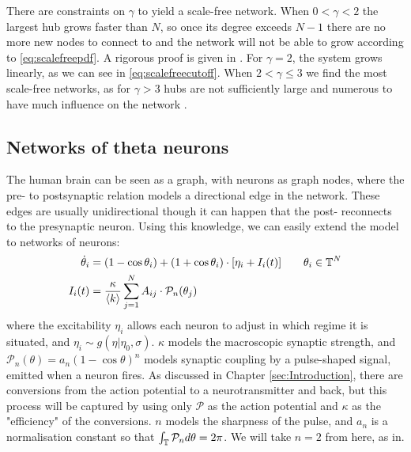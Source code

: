 There are constraints on $\gamma$ to yield a scale-free network. When $0 < \gamma < 2$ the largest hub grows faster than $N$, so once its degree exceeds $N-1$ there are no more new nodes to connect to and the network will not be able to grow according to \eqref{eq:scalefreepdf}. A rigorous proof is given in \cite{Bassler2011}. For $\gamma = 2$, the system grows linearly, as we can see in \eqref{eq:scalefreecutoff}. When $2 < \gamma \leq 3$ we find the most scale-free networks, as for $\gamma > 3$ hubs are not sufficiently large and numerous to have much influence on the network
\cite{BarabasiNetworkBook2016}.

\subsection{Networks of theta neurons}
The human brain can be seen as a graph, with neurons as graph nodes, where the pre- to postsynaptic relation models a directional edge in the network. These edges are usually unidirectional though it can happen that the post- reconnects to the presynaptic neuron. Using this knowledge, we can easily extend the model to networks of neurons:
\begin{align}
\dot{\theta}_{i} &=\left(1-\cos \theta_{i}\right)+\left(1+\cos \theta_{i}\right) \cdot \left[\eta_{i} + I_{i}(t)\right] \qquad \theta_i \in \T^N  \label{eq:thetaneuronnetwork} \\
I_{i}(t) &=\frac{\kappa}{\kmean} \sum_{j=1}^{N} A_{i j} \cdot \mathcal{P}_{n}(\theta_{j}) \label{eq:thetaneuronnetworkcurrent}
\end{align}
where the excitability $\eta_i$ allows each neuron to adjust in which regime it is situated, and $\eta_i \sim g(\eta \rvert \eta_0, \sigma)$. $\kappa$ models the macroscopic synaptic strength, and $\mathcal{P}_n(\theta)  = a_n(1 - \cos \theta)^n$ models synaptic coupling by a pulse-shaped signal, emitted when a neuron fires. As discussed in Chapter \ref{sec:Introduction}, there are conversions from the action potential to a neurotransmitter and back, but this process will be captured by using only $\mathcal{P}$ as the action potential and $\kappa$ as the "efficiency" of the conversions. $n$ models the sharpness of the pulse, and $a_n$ is a normalisation constant so that $\int_{{\mathbb{T}}} \mathcal{P}_{n} d \theta=2 \pi$. We will take $n=2$ from here, as in\cite{Luke2013, OttAntonsen2017, Martens2020}. 

